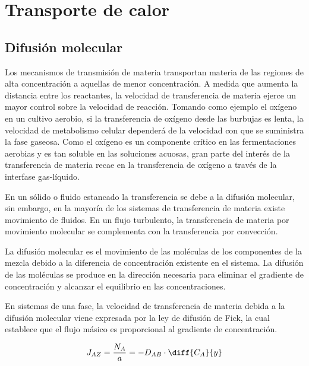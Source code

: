 \documentclass{AsignaturaResumen}
\begin{document}
    \chapter{Transporte de calor}
\fi


\section{Difusión molecular}

Los mecanismos de transmisión de materia transportan materia de las regiones de alta concentración a aquellas de menor concentración. A medida que aumenta la distancia entre los reactantes, la velocidad de transferencia de materia ejerce un mayor control sobre la velocidad de reacción. Tomando como ejemplo el oxígeno en un cultivo aerobio, si la transferencia de oxígeno desde las burbujas es lenta, la velocidad de metabolismo celular dependerá de la velocidad con que se suministra la fase gaseosa. Como el oxígeno es un componente crítico en las fermentaciones aerobias y es tan soluble en las soluciones acuosas, gran parte del interés de la transferencia de materia recae en la transferencia de oxígeno a través de la interfase gas-líquido.

En un sólido o fluido estancado la transferencia se debe a la difusión molecular, sin embargo, en la mayoría de los sistemas de transferencia de materia existe movimiento de fluidos. En un flujo turbulento, la transferencia de materia por movimiento molecular se complementa con la transferencia por convección.


    \marginpar{\begin{minipage}{\marginparwidth}\end{minipage}}     


La difusión molecular es el movimiento de las moléculas de los componentes de la mezcla debido a la diferencia de concentración existente en el sistema. La difusión de las moléculas se produce en la dirección necesaria para eliminar el gradiente de concentración y alcanzar el equilibrio en las concentraciones.

En sistemas de una fase, la velocidad de transferencia de materia debida a la difusión molecular viene expresada por la ley de difusión de Fick, la cual establece que el flujo másico es proporcional al gradiente de concentración.

\begin{equation}
    J_{AZ} = \frac{N_{A}}{a} = -D_{AB} \cdot \diff{C_{A}}{y}
\end{equation}
\end{document}
